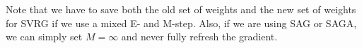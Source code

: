 Note that we have to save both the old set of weights and the new set of weights for SVRG if we use a mixed E- and M-step. Also, if we are using SAG or SAGA, we can simply set $M = \infty$ and never fully refresh the gradient.

